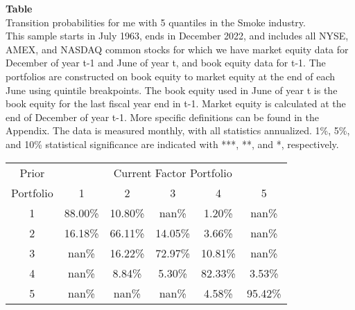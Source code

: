\begin{table*}[ht!]
\raggedright
{}
\label{tab: transition_probs_me_Smoke_with_5_quantiles}
\textbf{Table \thetable} \\
Transition probabilities for me with 5 quantiles in the Smoke industry. \\
\hspace*{1em}This sample starts in July 1963, ends in December 2022, and includes all NYSE, AMEX, and NASDAQ common stocks for which we have market equity data for December of year t-1 and June of year t, and book equity data for t-1. The portfolios are constructed on book equity to market equity at the end of each June using quintile breakpoints.  The book equity used in June of year t is the book equity for the last fiscal year end in t-1.  Market equity is calculated at the end of December of year t-1.  More specific definitions can be found in the Appendix.  The data is measured monthly, with all statistics annualized.  1\%, 5\%, and 10\% statistical significance are indicated with ***, **, and *, respectively. \\
\vspace{0.5em}
\centering
\begin{adjustbox}{max width=\textwidth}
\begin{tabular}{@{}cccccc@{}}
\toprule
Prior & \multicolumn{5}{c}{Current Factor Portfolio} \\
Portfolio & 1 & 2 & 3 & 4 & 5 \\
\midrule
1 & 88.00\% & 10.80\% & nan\% & 1.20\% & nan\% \\
2 & 16.18\% & 66.11\% & 14.05\% & 3.66\% & nan\% \\
3 & nan\% & 16.22\% & 72.97\% & 10.81\% & nan\% \\
4 & nan\% & 8.84\% & 5.30\% & 82.33\% & 3.53\% \\
5 & nan\% & nan\% & nan\% & 4.58\% & 95.42\% \\
\bottomrule
\end{tabular}
\end{adjustbox}
\end{table*}